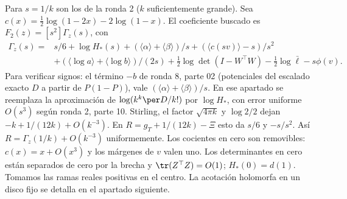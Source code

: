 Para $s=1/k$ son los de la ronda 2 ($k$ suficientemente grande). Sea
$c(x)=\tfrac12\log(1-2x)-2\log(1-x)$. El coeficiente buscado es
$F_2(z)=[s^2]\Gamma_z(s)$, con
\begin{align*}
 \Gamma_z(s)={}&s/6+\log H_*(s)
 +(\langle\alpha\rangle+\langle\beta\rangle)/s
 +(\langle c(sv)\rangle-s)/s^2\\
 &+(\langle\log a\rangle+\langle\log b\rangle)/(2s)
 +\tfrac12\log\det(I-W^\top W)-\tfrac12\log\bar\ell-s\phi(v).
\end{align*}
Para verificar signos: el término $-b$ de ronda 8, parte 02 (potenciales del
escalado exacto $D$ a partir de $P(1-P)$), vale
$(\langle\alpha\rangle+\langle\beta\rangle)/s$. En ese apartado se reemplaza la
aproximación de $\log(k^k\per D/k!)$ por $\log H_*$, con error uniforme $O(s^3)$
según ronda 2, parte 10. Stirling, el factor $\sqrt{4\pi k}$ y $\log2/2$ dejan
$-k+1/(12k)+O(k^{-3})$. En $R=g_T+1/(12k)-\Xi$ esto da $s/6$ y $-s/s^2$.
Así $R=\Gamma_z(1/k)+O(k^{-3})$ uniformemente.
Los cocientes en cero son removibles: $c(x)=x+O(x^3)$ y los márgenes de $v$ valen uno.
Los determinantes en cero están separados de cero por la brecha y
$\tr(Z^\top Z)=O(1)$; $H_*(0)=d(1)$. Tomamos las ramas reales positivas en el centro.
La acotación holomorfa en un disco fijo se detalla en el apartado siguiente.

